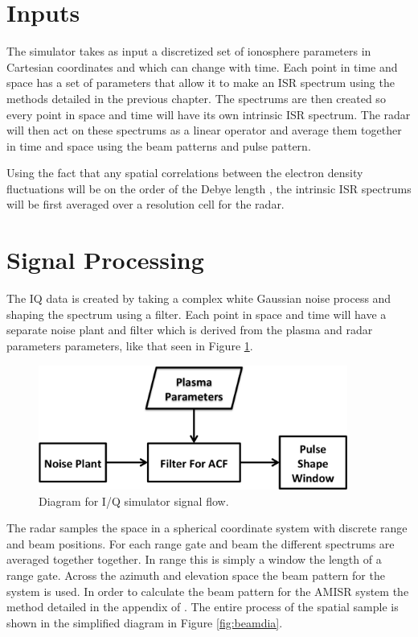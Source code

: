 \documentclass[10pt]{report}
\begin{document}
\section*{Inputs}
The simulator takes as input a discretized set of ionosphere parameters in Cartesian coordinates and which can change with time. Each point in time and space has a set of parameters that allow it to make an ISR spectrum using the methods detailed in the previous chapter. The spectrums are then created so every point in space and time will have its own intrinsic ISR spectrum. The radar will then act on these spectrums as a linear operator and average them together in time and space using the beam patterns and pulse pattern. 

Using the fact that any spatial correlations between the electron density fluctuations will be on the order of the Debye length \cite{farley1969}, the intrinsic ISR spectrums will be first averaged over a resolution cell for the radar. 

\section*{Signal Processing}
The IQ data is created by taking a complex white Gaussian noise process and shaping the spectrum using a filter. Each point in space and time will have a separate noise plant and filter which is derived from the plasma and radar parameters parameters, like that seen in Figure \ref{fig:IQdiagram}. 
\begin{figure}[h!]
\centering
\includegraphics[width=4in]{diagrampart}
\caption{Diagram for I/Q simulator signal flow.}
\label{fig:IQdiagram}
\end{figure}

The radar samples the space in a spherical coordinate system with discrete range and beam positions. For each range gate and beam the different spectrums are averaged together together. In range this is simply a window the length of a range gate. Across the azimuth and elevation space the beam pattern for the system is used. In order to calculate the beam pattern for the AMISR system the method detailed in the appendix of \cite{RDS:RDS20236}. The entire process of the spatial sample is shown in the simplified diagram in Figure \ref{fig:beamdia}.
\end{document}
